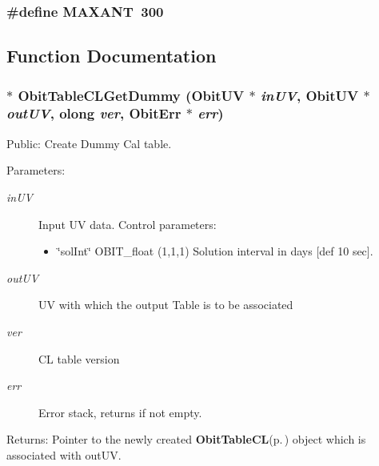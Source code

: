\subsubsection{\setlength{\rightskip}{0pt plus 5cm}\#define MAXANT\ 300}\label{ObitTableCLUtil_8c_a0}




\subsection{Function Documentation}
\subsubsection{$\ast$ Obit\-Table\-CLGet\-Dummy ({\bf Obit\-UV} $\ast$ {\em in\-UV}, {\bf Obit\-UV} $\ast$ {\em out\-UV}, {\bf olong} {\em ver}, {\bf Obit\-Err} $\ast$ {\em err})}\label{ObitTableCLUtil_8c_a2}


Public: Create Dummy Cal table. 

\begin{Desc}
\item[Parameters:]
\begin{description}
\item[{\em in\-UV}]Input UV data. Control parameters: \begin{itemize}
\item \char`\"{}sol\-Int\char`\"{} OBIT\_\-float (1,1,1) Solution interval in days [def 10 sec]. \end{itemize}
\item[{\em out\-UV}]UV with which the output Table is to be associated \item[{\em ver}]CL table version \item[{\em err}]Error stack, returns if not empty. \end{description}
\end{Desc}
\begin{Desc}
\item[Returns:]Pointer to the newly created {\bf Obit\-Table\-CL}{\rm (p.\,\pageref{structObitTableCL})} object which is associated with out\-UV. \end{Desc}
